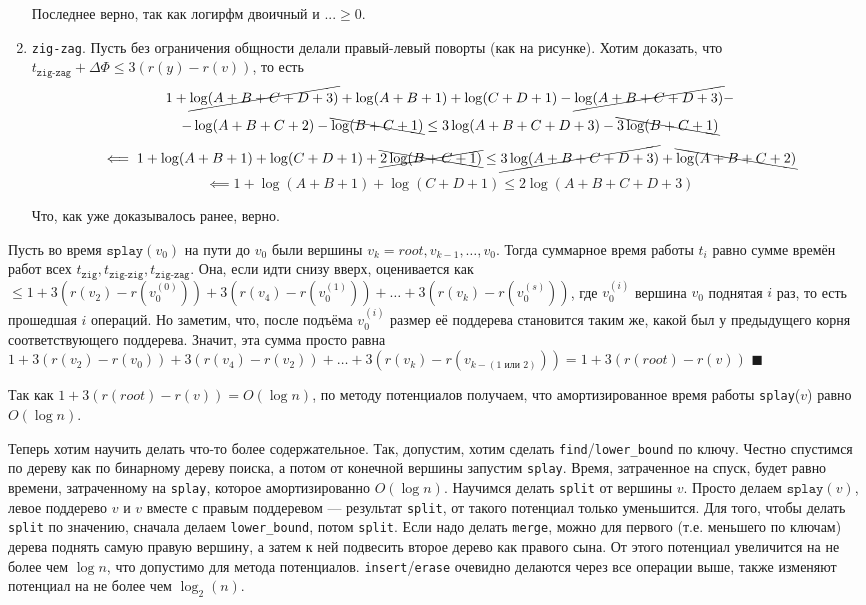 \begin{enumerate}
    Последнее верно, так как логирфм двоичный и $... \geq 0$.

    \item \texttt{zig-zag}. Пусть без ограничения общности делали правый-левый поворты (как на рисунке). Хотим доказать, что $t_\texttt{zig-zag} + \Delta \Phi \leq 3(r(y) - r(v))$, то есть
    \[ 1 + \cancel{\log(A + B + C + D + 3)} + \log(A + B + 1) + \log(C + D + 1) - \cancel{\log(A + B + C + D + 3)} - 
    \] \[  - \log(A + B + C + 2) - \bcancel{\log(B + C + 1)} \leq 3\log(A + B + C + D + 3) - \bcancel{3\log(B + C + 1)} \]
    \[ \impliedby 1 + \log(A + B + 1) + \log(C + D + 1) + \xcancel{2 \log(B + C + 1)} \leq \cancel{3\log(A + B + C + D + 3)} + \bcancel{\log(A + B + C + 2)} \]
    \[ \impliedby 1 + \log(A + B + 1) + \log(C + D + 1) \leq 2\log(A + B + C + D + 3) \]

    Что, как уже доказывалось ранее, верно.
\end{enumerate}

Пусть во время $\texttt{splay}(v_0)$ на пути до $v_0$ были вершины $v_k = root, v_{k - 1}, \ldots, v_0$. Тогда суммарное время работы $t_i$ равно сумме времён работ всех $t_\texttt{zig}, t_\texttt{zig-zig}, t_\texttt{zig-zag}$. Она, если идти снизу вверх, оценивается как $\leq 1 + 3(r(v_2) - r(v^{(0)}_0)) + 3(r(v_4) - r(v^{(1)}_0)) + \ldots + 3(r(v_k) - r(v^{(s)}_0))$, где $v^{(i)}_0$ вершина $v_0$ поднятая $i$ раз, то есть прошедшая $i$ операций. Но заметим, что, после подъёма $v^{(i)}_0$ размер её поддерева становится таким же, какой был у предыдущего корня соответствующего поддерева. Значит, эта сумма просто равна $1 + 3(r(v_2) - r(v_0)) + 3(r(v_4) - r(v_2)) + \ldots + 3(r(v_k) - r(v_{k - (\text{1 или 2})})) = 1 + 3(r(root) - r(v))$ $\blacksquare$
\let\sz\undefined

\bigskip

Так как $1 + 3(r(root) - r(v)) = O(\log n)$, по методу потенциалов получаем, что амортизированное время работы \texttt{splay}($v$) равно $O(\log n)$.

Теперь хотим научить делать что-то более содержательное. Так, допустим, хотим сделать \texttt{find}/\texttt{lower\_bound} по ключу. Честно спустимся по дереву как по бинарному дереву поиска, а потом от конечной вершины запустим \texttt{splay}. Время, затраченное на спуск, будет равно времени, затраченному на \texttt{splay}, которое амортизированно $O(\log n)$. Научимся делать \texttt{split} от вершины $v$. Просто делаем $\texttt{splay}(v)$, левое поддерево $v$ и $v$ вместе с правым поддеревом --- результат \texttt{split}, от такого потенциал только уменьшится. Для того, чтобы делать \texttt{split} по значению, сначала делаем \texttt{lower\_bound}, потом \texttt{split}. Если надо делать \texttt{merge}, можно для первого (т.е. меньшего по ключам) дерева поднять самую правую вершину, а затем к ней подвесить второе дерево как правого сына. От этого потенциал увеличится на не более чем $\log n$, что допустимо для метода потенциалов. \texttt{insert}/\texttt{erase} очевидно делаются через все операции выше, также изменяют потенциал на не более чем $\log_2(n)$.